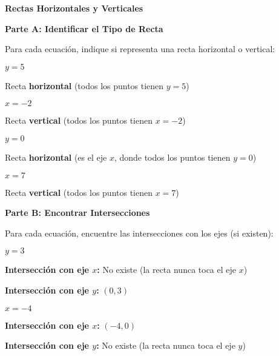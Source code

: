 \begin{exercise}
\textbf{Rectas Horizontales y Verticales}

\textbf{Parte A: Identificar el Tipo de Recta}

Para cada ecuación, indique si representa una recta horizontal o vertical:

\problem $y = 5$

\begin{solucion}
Recta \textbf{horizontal} (todos los puntos tienen $y = 5$)
\end{solucion}

\problem $x = -2$

\begin{solucion}
Recta \textbf{vertical} (todos los puntos tienen $x = -2$)
\end{solucion}

\problem $y = 0$

\begin{solucion}
Recta \textbf{horizontal} (es el eje $x$, donde todos los puntos tienen $y = 0$)
\end{solucion}

\problem $x = 7$

\begin{solucion}
Recta \textbf{vertical} (todos los puntos tienen $x = 7$)
\end{solucion}

\vspace{0.5cm}

\textbf{Parte B: Encontrar Intersecciones}

Para cada ecuación, encuentre las intersecciones con los ejes (si existen):

\problem $y = 3$

\begin{solucion}
\textbf{Intersección con eje $x$:} No existe (la recta nunca toca el eje $x$)

\textbf{Intersección con eje $y$:} $(0, 3)$
\end{solucion}

\problem $x = -4$

\begin{solucion}
\textbf{Intersección con eje $x$:} $(-4, 0)$

\textbf{Intersección con eje $y$:} No existe (la recta nunca toca el eje $y$)
\end{solucion}


\end{exercise}
